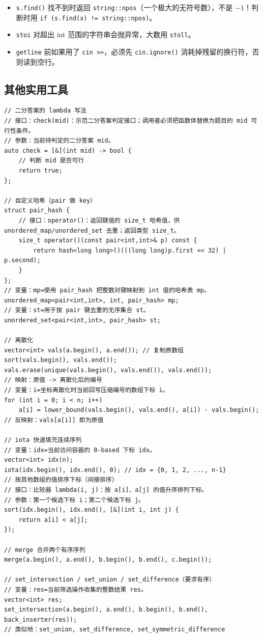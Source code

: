 \documentclass[UTF8,openany,oneside,zihao=-4]{ctexbook}
\begin{document}
\begin{warn}
\begin{itemize}
  \item \lstinline|s.find()| 找不到时返回 \lstinline|string::npos|（一个极大的无符号数），不是 $-1$！判断时用 \lstinline|if (s.find(x) != string::npos)|。
  \item \lstinline|stoi| 对超出 int 范围的字符串会抛异常，大数用 \lstinline|stoll|。
  \item \lstinline|getline| 前如果用了 \lstinline|cin >>|，必须先 \lstinline|cin.ignore()| 消耗掉残留的换行符，否则读到空行。
\end{itemize}
\end{warn}

\subsection{其他实用工具}

\begin{lstlisting}
// 二分答案的 lambda 写法
// 接口：check(mid)：示范二分答案判定接口；调用者必须把函数体替换为题目的 mid 可行性条件。
// 参数：当前待判定的二分答案 mid。
auto check = [&](int mid) -> bool {
    // 判断 mid 是否可行
    return true;
};

// 自定义哈希（pair 做 key）
struct pair_hash {
    // 接口：operator()：返回键值的 size_t 哈希值，供 unordered_map/unordered_set 去重；返回类型 size_t。
    size_t operator()(const pair<int,int>& p) const {
        return hash<long long>()(((long long)p.first << 32) | p.second);
    }
};
// 变量：mp=使用 pair_hash 把整数对键映射到 int 值的哈希表 mp。
unordered_map<pair<int,int>, int, pair_hash> mp;
// 变量：st=用于按 pair 键去重的无序集合 st。
unordered_set<pair<int,int>, pair_hash> st;

// 离散化
vector<int> vals(a.begin(), a.end()); // 复制原数组
sort(vals.begin(), vals.end());
vals.erase(unique(vals.begin(), vals.end()), vals.end());
// 映射：原值 -> 离散化后的编号
// 变量：i=坐标离散化时当前回写压缩编号的数组下标 i。
for (int i = 0; i < n; i++)
    a[i] = lower_bound(vals.begin(), vals.end(), a[i]) - vals.begin();
// 反映射：vals[a[i]] 即为原值

// iota 快速填充连续序列
// 变量：idx=当前访问容器的 0-based 下标 idx。
vector<int> idx(n);
iota(idx.begin(), idx.end(), 0); // idx = {0, 1, 2, ..., n-1}
// 按其他数组的值排序下标（间接排序）
// 接口：比较器 lambda(i, j)：按 a[i]、a[j] 的值升序排列下标。
// 参数：第一个候选下标 i；第二个候选下标 j。
sort(idx.begin(), idx.end(), [&](int i, int j) {
    return a[i] < a[j];
});

// merge 合并两个有序序列
merge(a.begin(), a.end(), b.begin(), b.end(), c.begin());

// set_intersection / set_union / set_difference（要求有序）
// 变量：res=当前筛选操作收集的整数结果 res。
vector<int> res;
set_intersection(a.begin(), a.end(), b.begin(), b.end(), back_inserter(res));
// 类似地：set_union, set_difference, set_symmetric_difference
\end{lstlisting}
\end{document}
